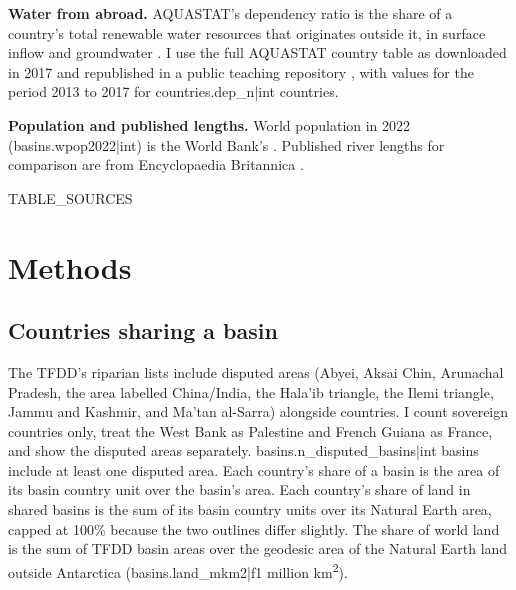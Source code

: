 \documentclass[11pt,a4paper]{article}
\begin{document}
\textbf{Water from abroad.} AQUASTAT's dependency ratio is the share of a country's total renewable water resources that originates outside it, in surface inflow and groundwater \citep{aquastat}. I use the full AQUASTAT country table as downloaded in 2017 and republished in a public teaching repository \citep{pycon}, with values for the period 2013 to 2017 for {{countries.dep_n|int}} countries.

\textbf{Population and published lengths.} World population in 2022 ({{basins.wpop2022|int}}) is the World Bank's \citep{wb}. Published river lengths for comparison are from Encyclopaedia Britannica \citep{brit_nile,brit_amazon,brit_yangtze}.

{{TABLE_SOURCES}}

\section{Methods}
\subsection{Countries sharing a basin}
The TFDD's riparian lists include disputed areas (Abyei, Aksai Chin, Arunachal Pradesh, the area labelled China/India, the Hala'ib triangle, the Ilemi triangle, Jammu and Kashmir, and Ma'tan al-Sarra) alongside countries. I count sovereign countries only, treat the West Bank as Palestine and French Guiana as France, and show the disputed areas separately. {{basins.n_disputed_basins|int}} basins include at least one disputed area. Each country's share of a basin is the area of its basin country unit over the basin's area. Each country's share of land in shared basins is the sum of its basin country units over its Natural Earth area, capped at 100\% because the two outlines differ slightly. The share of world land is the sum of TFDD basin areas over the geodesic area of the Natural Earth land outside Antarctica ({{basins.land_mkm2|f1}} million km\textsuperscript{2}).
\end{document}
